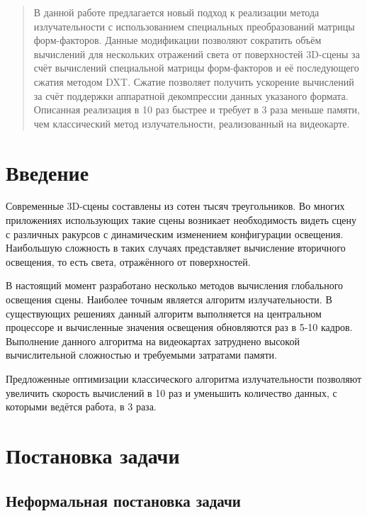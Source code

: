 \documentclass[12pt,fleqn]{article}
\begin{document}
\newpage
\renewcommand{\contentsname}{Содержание}
\tableofcontents

\newpage
\begin{abstract}
    В данной работе предлагается новый подход к реализации метода излучательности с использованием специальных преобразований матрицы форм-факторов. Данные модификации позволяют сократить объём вычислений для нескольких отражений света от поверхностей 3D-сцены за счёт вычислений специальной матрицы форм-факторов и её последующего сжатия методом DXT. Сжатие позволяет получить ускорение вычислений за счёт поддержки аппаратной декомпрессии данных указаного формата. Описанная реализация в 10 раз быстрее и требует в 3 раза меньше памяти, чем классический метод излучательности, реализованный на видеокарте.
\end{abstract}

\newpage
\section{Введение}

Современные 3D-сцены составлены из сотен тысяч треугольников. Во многих приложениях использующих такие сцены возникает необходимость видеть сцену с различных ракурсов с динамическим изменением конфигурации освещения. Наибольшую сложность в таких случаях представляет вычисление вторичного освещения, то есть света, отражённого от поверхностей.

В настоящий момент разработано несколько методов вычисления глобального освещения сцены. Наиболее точным является алгоритм излучательности. В существующих решениях данный алгоритм выполняется на центральном процессоре и вычисленные значения освещения обновляются раз в 5-10 кадров. Выполнение данного алгоритма на видеокартах затруднено высокой вычислительной сложностью и требуемыми затратами памяти.

Предложенные оптимизации классического алгоритма излучательности позволяют увеличить скорость вычислений в 10 раз и уменьшить количество данных, с которыми ведётся работа, в 3 раза.

\pagebreak

\section{Постановка задачи}

\subsection{Неформальная постановка задачи}
\end{document}
